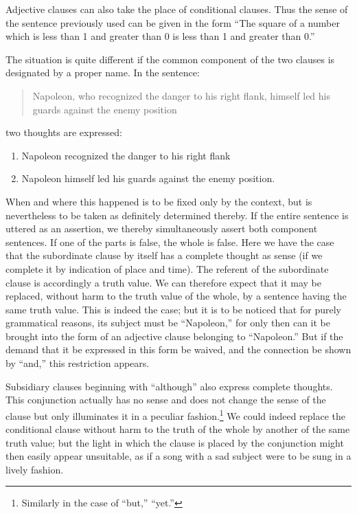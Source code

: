 \documentclass[twoside,12pt,a4paper]{article}
\begin{document}
Adjective clauses can also take the place of conditional clauses. Thus
the sense of the sentence previously used can be given in the form
``The square of a number which is less than 1 and greater than 0 is
less than 1 and greater than 0.''

The situation is quite different if the common component of the two
clauses is designated by a proper name. In the sentence:

\begin{quote}
  Napoleon, who recognized the danger to his right flank, himself led
  his guards against the enemy position
\end{quote}

\noindent two thoughts are expressed:

\begin{enumerate}
\item Napoleon recognized the danger to his right flank
\item Napoleon himself led his guards against the enemy position.
\end{enumerate}

\noindent When and where this happened is to be fixed only by the
context, but is nevertheless to be taken as definitely determined
thereby. If the entire sentence is uttered as an assertion, we thereby
simultaneously assert both component sentences. If one of the parts is
false, the whole is false. Here we have the case that the subordinate
clause by itself has a complete thought as sense (if we complete it by
indication of place and time). The referent of the subordinate clause
is accordingly a truth value. We can therefore expect that it may be
replaced, without harm to the truth value of the whole, by a sentence
having the  same truth value. This is indeed the case;
but it is to be noticed that for purely grammatical reasons, its
subject must be ``Napoleon,'' for only then can it be brought into the
form of an adjective clause belonging to ``Napoleon.'' But if the
demand that it be expressed in this form be waived, and the connection
be shown by ``and,'' this restriction appears.

Subsidiary clauses beginning with ``although'' also express complete
thoughts. This conjunction actually has no sense and does not change
the sense of the clause but only illuminates it in a peculiar
fashion.\footnote[12]{Similarly in the case of ``but,'' ``yet.''} We
could indeed replace the conditional clause without harm to the truth
of the whole by another of the same truth value; but the light in
which the clause is placed by the conjunction might then easily appear
unsuitable, as if a song with a sad subject were to be sung in a
lively fashion.
\end{document}
